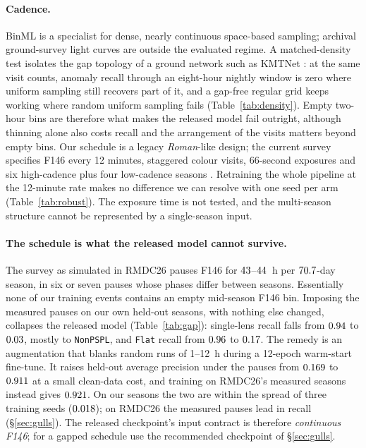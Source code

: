 \documentclass[twocolumn,linenumbers,floatfix,twocolappendix]{aastex701}
\newcommand{\Rom}{\textit{Roman}}
\begin{document}
\paragraph{Cadence.} BinML is a specialist for dense, nearly continuous space-based sampling; archival ground-survey
light curves are outside the evaluated regime. A matched-density test isolates the gap topology of a ground network
such as KMTNet \citep{Kim2016}: at the same visit counts, anomaly recall through an eight-hour nightly window is zero
where uniform sampling still recovers part of it, and a gap-free regular grid keeps working where random uniform
sampling fails (Table~\ref{tab:density}). Empty two-hour bins are therefore what makes the released model fail
outright, although thinning alone also costs recall and the arrangement of the visits matters beyond empty bins. Our
schedule is a legacy \Rom{}-like design; the current survey specifies F146 every 12 minutes, staggered colour visits, 66-second exposures and six high-cadence
plus four low-cadence seasons \citep{STScI2025GBTDS,ROTAC2025}. Retraining the whole pipeline at the 12-minute rate
makes no difference we can resolve with one seed per arm (Table~\ref{tab:robust}). The exposure time is not tested,
and the multi-season structure cannot be represented by a single-season input.

\paragraph{The schedule is what the released model cannot survive.} The survey as simulated in RMDC26
\citep{RGESPIT2026} pauses F146 for $43$--$44$~h per $70.7$-day
season, in six or seven pauses whose phases differ between seasons. Essentially none of our training events contains
an empty mid-season F146 bin. Imposing the measured pauses on our own held-out seasons, with nothing else changed,
collapses the released model (Table~\ref{tab:gap}): single-lens recall falls from $0.94$ to
$0.03$, mostly to \texttt{NonPSPL}, and \texttt{Flat} recall from $0.96$ to
$0.17$. The remedy is an augmentation that blanks random runs of 1--12~h during a 12-epoch
warm-start fine-tune. It raises held-out average precision under the pauses from $0.169$ to
$0.911$ at a small clean-data cost, and training on RMDC26's measured seasons instead gives
$0.921$. On our seasons the two are within the spread of three training seeds ($0.018$); on
RMDC26 the measured pauses lead in recall (\S\ref{sec:gulls}). The released checkpoint's input contract is therefore
\emph{continuous F146}; for a gapped schedule use the recommended checkpoint of \S\ref{sec:gulls}.
\end{document}
